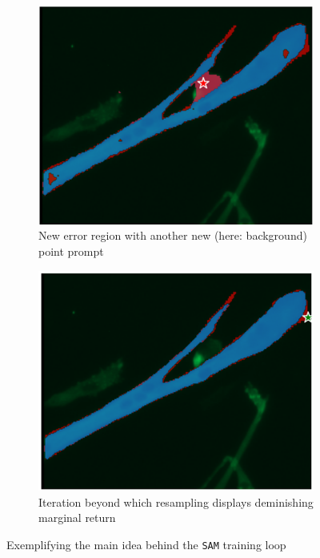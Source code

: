 \begin{figure}
	\medskip
	
	\begin{subfigure}{0.45\textwidth}
		\centering
		\includegraphics[width=\linewidth]{images/training3}
		\caption{New error region with another new (here: background) point prompt}
		\label{figtrain3}
	\end{subfigure}
	\hfill
	\begin{subfigure}{0.45\textwidth}
		\centering
		\includegraphics[width=\linewidth]{images/training4}
		\caption{Iteration beyond which resampling displays deminishing marginal return}
		\label{figtrain4}
	\end{subfigure}
	\caption[\texttt{SAM} trainings loop]{Exemplifying the main idea behind the \texttt{SAM} training loop}
	\label{figtrain}
\end{figure}

